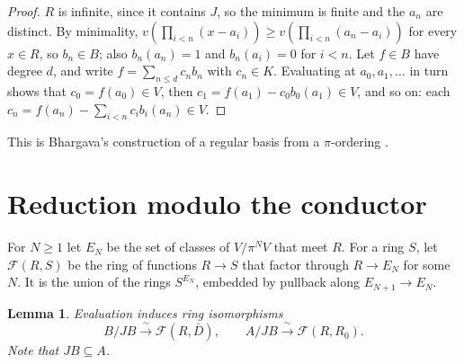 \documentclass[11pt,a4paper]{article}
\theoremstyle{plain}
\newtheorem{lemma}[theorem]{Lemma}
\theoremstyle{remark}
\newcommand{\Fn}{\mathcal F}
\begin{document}
\begin{proof}
$R$ is infinite, since it contains $J$, so the minimum is finite and the $a_n$ are distinct. By minimality,
$v(\prod_{i<n}(x-a_i))\geq v(\prod_{i<n}(a_n-a_i))$ for every $x\in R$, so $b_n\in B$; also $b_n(a_n)=1$ and
$b_n(a_i)=0$ for $i<n$. Let $f\in B$ have degree $d$, and write $f=\sum_{n\le d}c_nb_n$ with $c_n\in K$. Evaluating
at $a_0,a_1,\dots$ in turn shows that $c_0=f(a_0)\in V$, then $c_1=f(a_1)-c_0b_0(a_1)\in V$, and so on: each
$c_n=f(a_n)-\sum_{i<n}c_ib_i(a_n)\in V$.
\end{proof}

This is Bhargava's construction of a regular basis from a $\pi$-ordering \cite{Bha}.

\section{Reduction modulo the conductor}

For $N\geq1$ let $E_N$ be the set of classes of $V/\pi^NV$ that meet $R$. For a ring $S$, let $\Fn(R,S)$ be the ring
of functions $R\to S$ that factor through $R\to E_N$ for some $N$. It is the union of the rings $S^{E_N}$, embedded
by pullback along $E_{N+1}\to E_N$.

\begin{lemma}\label{lem:indicators}
Evaluation induces ring isomorphisms
\[
 B/JB\xrightarrow{\ \sim\ }\Fn(R,\bar D),\qquad A/JB\xrightarrow{\ \sim\ }\Fn(R,R_0).
\]
Note that $JB\subseteq A$.
\end{lemma}
\end{document}
